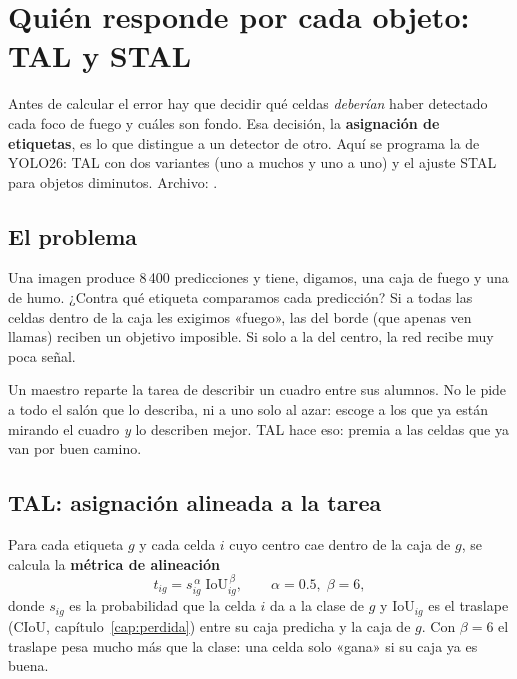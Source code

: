\chapter{Quién responde por cada objeto: TAL y STAL}
\label{cap:asignacion}

\begin{enpocas}
Antes de calcular el error hay que decidir qué celdas \emph{deberían} haber
detectado cada foco de fuego y cuáles son fondo. Esa decisión, la
\textbf{asignación de etiquetas}, es lo que distingue a un detector de otro. Aquí se
programa la de YOLO26: TAL con dos variantes (uno a muchos y uno a uno) y el
ajuste STAL para objetos diminutos. Archivo: .
\end{enpocas}

\section{El problema}

Una imagen produce 8\,400 predicciones y tiene, digamos, una caja de fuego y una
de humo. ¿Contra qué etiqueta comparamos cada predicción? Si a todas las celdas
dentro de la caja les exigimos «fuego», las del borde (que apenas ven llamas)
reciben un objetivo imposible. Si solo a la del centro, la red recibe muy poca
señal.

\begin{ejemplo}
Un maestro reparte la tarea de describir un cuadro entre sus alumnos. No le pide
a todo el salón que lo describa, ni a uno solo al azar: escoge a los que ya
están mirando el cuadro \emph{y} lo describen mejor. TAL hace eso: premia a las
celdas que ya van por buen camino.
\end{ejemplo}

\section{TAL: asignación alineada a la tarea}

Para cada etiqueta $g$ y cada celda $i$ cuyo centro cae dentro de la caja de $g$,
se calcula la \textbf{métrica de alineación}
\begin{equation}
t_{ig} = s_{ig}^{\,\alpha}\;\mathrm{IoU}_{ig}^{\,\beta},\qquad \alpha = 0.5,\; \beta = 6,
\label{eq:tal}
\end{equation}
donde $s_{ig}$ es la probabilidad que la celda $i$ da a la clase de $g$ y
$\mathrm{IoU}_{ig}$ es el traslape (CIoU, capítulo~\ref{cap:perdida}) entre su caja
predicha y la caja de $g$. Con $\beta = 6$ el traslape pesa mucho más que la
clase: una celda solo «gana» si su caja ya es buena.

